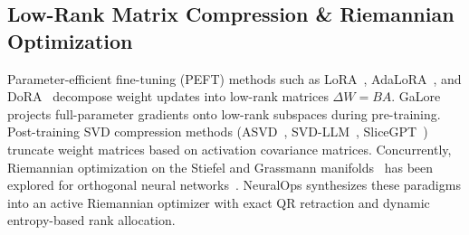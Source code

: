 \subsection{Low-Rank Matrix Compression \& Riemannian Optimization}
Parameter-efficient fine-tuning (PEFT) methods such as LoRA~\cite{hu2021lora}, AdaLoRA~\cite{zhang2023adalora}, and DoRA~\cite{liu2024dora} decompose weight updates into low-rank matrices $\Delta W = B A$. GaLore~\cite{zhao2024galore} projects full-parameter gradients onto low-rank subspaces during pre-training. Post-training SVD compression methods (ASVD~\cite{yuan2023asvd}, SVD-LLM~\cite{wang2024svdllm}, SliceGPT~\cite{ashkboos2024slicegpt}) truncate weight matrices based on activation covariance matrices. Concurrently, Riemannian optimization on the Stiefel and Grassmann manifolds~\cite{absil2008optimization,edelman1998geometry} has been explored for orthogonal neural networks~\cite{le2015simple,huang2018orthogonal}. NeuralOps synthesizes these paradigms into an active Riemannian optimizer with exact QR retraction and dynamic entropy-based rank allocation.
